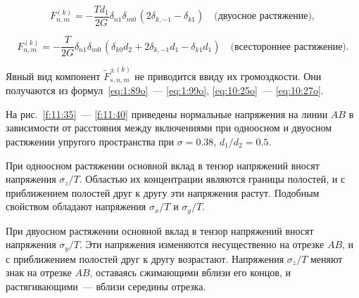 \begin{equation*}
F_{n,m}^{(k)} =  -\frac{Td_1}{2G}{\delta _{n1}}{\delta _{m0\,}}(2{\delta _{k, - 1}} - {\delta _{k1}})\quad\text{(двуосное растяжение)},
\end{equation*}

\begin{equation*}
F_{n,m}^{(k)} =  -\frac{T}{2G}{\delta _{n1}}{\delta _{m0\,}}(\delta_{k0}d_2+2{\delta _{k, - 1}}d_1 - {\delta _{k1}}d_1)\quad\text{(всестороннее растяжение)}.
\end{equation*}

Явный вид компонент $\tilde F_{s,n,m}^{\pm(k)}$ не приводится ввиду их громоздкости. Они получаются из формул~\eqref{eq:1:89o}~--- \eqref{eq:1:99o}, \eqref{eq:10:25o}~--- \eqref{eq:10:27o}.

На рис.~\ref{f:11:35}~--- \ref{f:11:40} приведены нормальные напряжения на линии $AB$ в зависимости от расстояния между включениями при одноосном и двуосном растяжении упругого пространства при $\sigma=0.38$, $d_1/d_2=0.5$.

При одноосном растяжении основной вклад в тензор напряжений вносят напряжения $\sigma_z/T$. Областью их концентрации являются границы полостей, и с приближением полостей друг к другу эти напряжения растут. Подобным свойством обладают напряжения $\sigma_x/T$ и $\sigma_y/T$.

При двуосном растяжении основной вклад в тензор напряжений вносят напряжения $\sigma_y/T$. Эти напряжения изменяются несущественно на отрезке $AB$, и с приближением полостей друг к другу возрастают. Напряжения $\sigma_z/T$ меняют знак на отрезке $AB$, оставаясь сжимающими вблизи его концов, и растягивающими~--- вблизи середины отрезка.

